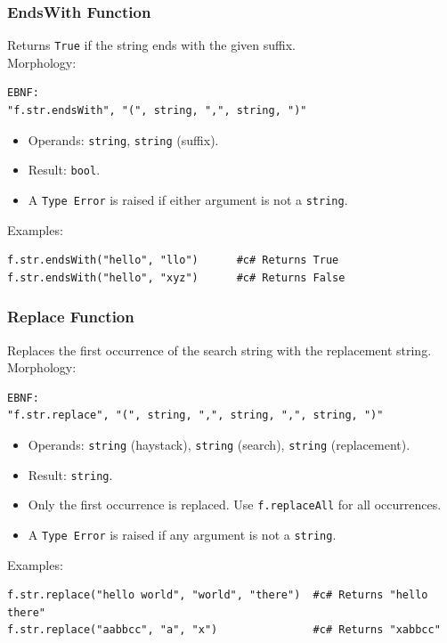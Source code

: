 \subsubsection{EndsWith Function}
Returns \texttt{True} if the string ends with the given suffix. \\
Morphology:
\begin{verbatim}
EBNF:
"f.str.endsWith", "(", string, ",", string, ")"
\end{verbatim}
\begin{itemize}
\item Operands: \texttt{string}, \texttt{string} (suffix).
\item Result: \texttt{bool}.
\item A \texttt{Type Error} is raised if either argument is not a \texttt{string}.
\end{itemize}
Examples:
\begin{verbatim}
f.str.endsWith("hello", "llo")      #c# Returns True
f.str.endsWith("hello", "xyz")      #c# Returns False
\end{verbatim}

\subsubsection{Replace Function}
Replaces the first occurrence of the search string with the replacement string. \\
Morphology:
\begin{verbatim}
EBNF:
"f.str.replace", "(", string, ",", string, ",", string, ")"
\end{verbatim}
\begin{itemize}
\item Operands: \texttt{string} (haystack), \texttt{string} (search), \texttt{string} (replacement).
\item Result: \texttt{string}.
\item Only the first occurrence is replaced. Use \texttt{f.replaceAll} for all occurrences.
\item A \texttt{Type Error} is raised if any argument is not a \texttt{string}.
\end{itemize}
Examples:
\begin{verbatim}
f.str.replace("hello world", "world", "there")  #c# Returns "hello there"
f.str.replace("aabbcc", "a", "x")               #c# Returns "xabbcc"
\end{verbatim}

